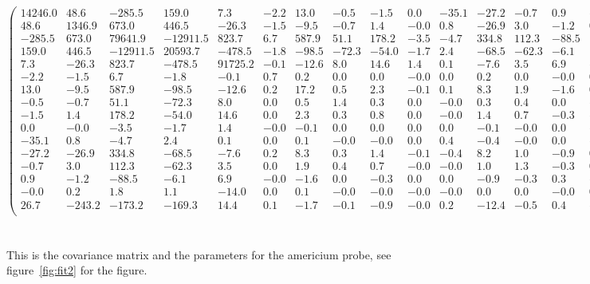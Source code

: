 \begin{equation*}
    \begin{pmatrix}
        14246.0 &48.6 &-285.5 &159.0 &7.3 &-2.2 &13.0 &-0.5 &-1.5 &0.0 &-35.1 &-27.2 &-0.7 &0.9 &-0.0 &26.7 \\
        48.6 &1346.9 &673.0 &446.5 &-26.3 &-1.5 &-9.5 &-0.7 &1.4 &-0.0 &0.8 &-26.9 &3.0 &-1.2 &0.2 &-243.2 \\
        -285.5 &673.0 &79641.9 &-12911.5 &823.7 &6.7 &587.9 &51.1 &178.2 &-3.5 &-4.7 &334.8 &112.3 &-88.5 &1.8 &-173.2 \\
        159.0 &446.5 &-12911.5 &20593.7 &-478.5 &-1.8 &-98.5 &-72.3 &-54.0 &-1.7 &2.4 &-68.5 &-62.3 &-6.1 &1.1 &-169.3 \\
        7.3 &-26.3 &823.7 &-478.5 &91725.2 &-0.1 &-12.6 &8.0 &14.6 &1.4 &0.1 &-7.6 &3.5 &6.9 &-14.0 &14.4 \\
        -2.2 &-1.5 &6.7 &-1.8 &-0.1 &0.7 &0.2 &0.0 &0.0 &-0.0 &0.0 &0.2 &0.0 &-0.0 &0.0 &0.1 \\
        13.0 &-9.5 &587.9 &-98.5 &-12.6 &0.2 &17.2 &0.5 &2.3 &-0.1 &0.1 &8.3 &1.9 &-1.6 &0.1 &-1.7 \\
        -0.5 &-0.7 &51.1 &-72.3 &8.0 &0.0 &0.5 &1.4 &0.3 &0.0 &-0.0 &0.3 &0.4 &0.0 &-0.0 &-0.1 \\
        -1.5 &1.4 &178.2 &-54.0 &14.6 &0.0 &2.3 &0.3 &0.8 &0.0 &-0.0 &1.4 &0.7 &-0.3 &-0.0 &-0.9 \\
        0.0 &-0.0 &-3.5 &-1.7 &1.4 &-0.0 &-0.1 &0.0 &0.0 &0.0 &0.0 &-0.1 &-0.0 &0.0 &-0.0 &-0.0 \\
        -35.1 &0.8 &-4.7 &2.4 &0.1 &0.0 &0.1 &-0.0 &-0.0 &0.0 &0.4 &-0.4 &-0.0 &0.0 &-0.0 &0.2 \\
        -27.2 &-26.9 &334.8 &-68.5 &-7.6 &0.2 &8.3 &0.3 &1.4 &-0.1 &-0.4 &8.2 &1.0 &-0.9 &0.0 &-12.4 \\
        -0.7 &3.0 &112.3 &-62.3 &3.5 &0.0 &1.9 &0.4 &0.7 &-0.0 &-0.0 &1.0 &1.3 &-0.3 &0.0 &-0.5 \\
        0.9 &-1.2 &-88.5 &-6.1 &6.9 &-0.0 &-1.6 &0.0 &-0.3 &0.0 &0.0 &-0.9 &-0.3 &0.3 &-0.0 &0.4 \\
        -0.0 &0.2 &1.8 &1.1 &-14.0 &0.0 &0.1 &-0.0 &-0.0 &-0.0 &-0.0 &0.0 &0.0 &-0.0 &0.0 &-0.2 \\
        26.7 &-243.2 &-173.2 &-169.3 &14.4 &0.1 &-1.7 &-0.1 &-0.9 &-0.0 &0.2 &-12.4 &-0.5 &0.4 &-0.2 &272.5 \\
    \end{pmatrix}
   \end{equation*}
   \normalsize
   \\\\
 \clearpage
This is the covariance matrix and the parameters for the americium probe, see
figure~\ref{fig:fit2} for the figure.

